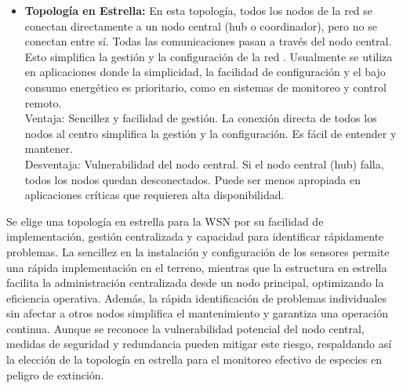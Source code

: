 \begin{itemize}
\item \textbf{Topología en Estrella:} En esta topología, todos los nodos de la red se conectan directamente a un nodo central (hub o coordinador), pero no se conectan entre sí. Todas las comunicaciones pasan a través del nodo central. Esto simplifica la gestión y la configuración de la red \cite{estrella}. Usualmente se utiliza en aplicaciones donde la simplicidad, la facilidad de configuración y el bajo consumo energético es prioritario, como en sistemas de monitoreo y control remoto.\\
Ventaja: Sencillez y facilidad de gestión. La conexión directa de todos los nodos al centro simplifica la gestión y la configuración. Es fácil de entender y mantener.\\
Desventaja: Vulnerabilidad del nodo central. Si el nodo central (hub) falla, todos los nodos quedan desconectados. Puede ser menos apropiada en aplicaciones críticas que requieren alta disponibilidad.
\end{itemize}
Se elige una topología en estrella para la WSN por su facilidad de implementación, gestión centralizada y capacidad para identificar rápidamente problemas. La sencillez en la instalación y configuración de los sensores permite una rápida implementación en el terreno, mientras que la estructura en estrella facilita la administración centralizada desde un nodo principal, optimizando la eficiencia operativa. Además, la rápida identificación de problemas individuales sin afectar a otros nodos simplifica el mantenimiento y garantiza una operación continua. Aunque se reconoce la vulnerabilidad potencial del nodo central, medidas de seguridad y redundancia pueden mitigar este riesgo, respaldando así la elección de la topología en estrella para el monitoreo efectivo de especies en peligro de extinción.

